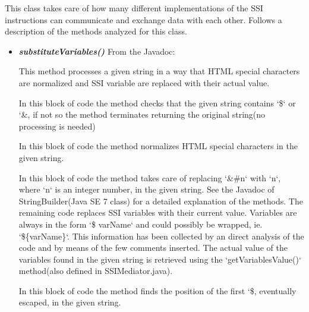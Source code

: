 \documentclass[11pt,titlepage]{article} %
\begin{document}
  \noindent This class takes care of
  how many different implementations of the SSI instructions can communicate and exchange data with each other.\newline
  Follows a description of the methods analyzed for this class.
  \begin{itemize}
   \item \textbf{\textit{substituteVariables()}}
    \newline From the Javadoc:
    
    This method processes a given string in a way that HTML special characters are normalized and SSI variable are replaced with their
    actual value.

    In this block of code the method checks that the given string contains `\$` or `\&, if not so the method terminates returning the original string(no processing  is needed)
    

    In this block of code the method normalizes HTML special characters in the given string.
    


    In this block of code the method takes care of replacing `\&\#n` with `n`, where `n` is an integer number, in the given string.
    See the Javadoc of StringBuilder(Java SE 7 class) for a detailed explanation of the methods.\newline
    The remaining code replaces SSI variables with their current value.\newline
    Variables are always in the form `\$ varName` and could possibly be wrapped, ie. `\$\{varName\}`.
    This information has been collected by an direct analysis of the code and by means of the few comments inserted.
    The actual value of the variables found in the given string is retrieved using the `getVariablesValue()` method(also defined in SSIMediator.java).\newline
    

    In this block of code the method finds the position of the first `\$, eventually escaped, in the given string.\newline
    


\end{itemize}
\end{document}
